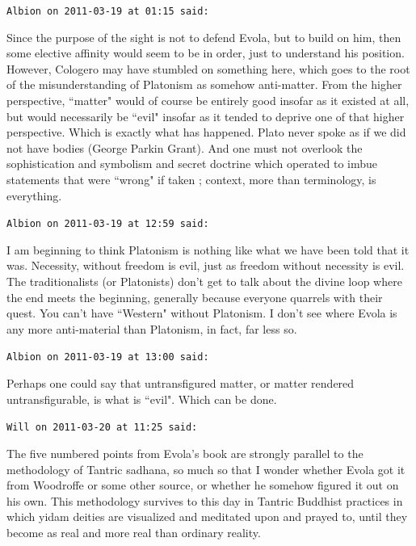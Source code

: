 \begin{footnotesize}\begin{sffamily}



\texttt{Albion on 2011-03-19 at 01:15 said: }

Since the purpose of the sight is not to defend Evola, but to build on him, then some elective affinity would seem to be in order, just to understand his position. However, Cologero may have stumbled on something here, which goes to the root of the misunderstanding of Platonism as somehow anti-matter. From the higher perspective, ``matter" would of course be entirely good insofar as it existed at all, but would necessarily be ``evil" insofar as it tended to deprive one of that higher perspective. Which is exactly what has happened. Plato never spoke as if we did not have bodies (George Parkin Grant). And one must not overlook the sophistication and symbolism and secret doctrine which operated to imbue statements that were ``wrong" if taken ; context, more than terminology, is everything.


\hfill

\texttt{Albion on 2011-03-19 at 12:59 said: }

I am beginning to think Platonism is nothing like what we have been told that it was. Necessity, without freedom is evil, just as freedom without necessity is evil. The traditionalists (or Platonists) don't get to talk about the divine loop where the end meets the beginning, generally because everyone quarrels with their quest. You can't have ``Western" without Platonism. I don't see where Evola is any more anti-material than Platonism, in fact, far less so.


\hfill

\texttt{Albion on 2011-03-19 at 13:00 said: }

Perhaps one could say that untransfigured matter, or matter rendered untransfigurable, is what is ``evil". Which can be done.


\hfill

\texttt{Will on 2011-03-20 at 11:25 said: }

The five numbered points from Evola's book are strongly parallel to the methodology of Tantric sadhana, so much so that I wonder whether Evola got it from Woodroffe or some other source, or whether he somehow figured it out on his own. This methodology survives to this day in Tantric Buddhist practices in which yidam deities are visualized and meditated upon and prayed to, until they become as real and more real than ordinary reality.


\end{sffamily}
\end{footnotesize}

